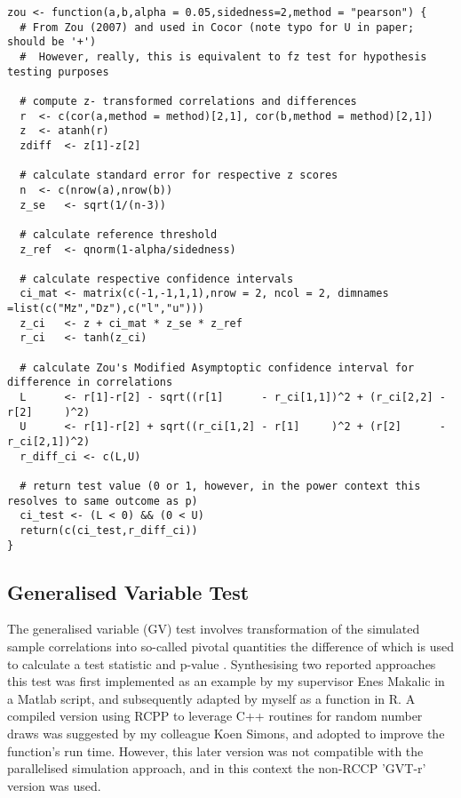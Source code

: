 \begin{lstlisting}[caption={Zou's confidence interval}]
zou <- function(a,b,alpha = 0.05,sidedness=2,method = "pearson") {
  # From Zou (2007) and used in Cocor (note typo for U in paper; should be '+')
  #  However, really, this is equivalent to fz test for hypothesis testing purposes
  
  # compute z- transformed correlations and differences
  r  <- c(cor(a,method = method)[2,1], cor(b,method = method)[2,1])
  z  <- atanh(r)
  zdiff  <- z[1]-z[2]
  
  # calculate standard error for respective z scores
  n  <- c(nrow(a),nrow(b))
  z_se   <- sqrt(1/(n-3))

  # calculate reference threshold
  z_ref  <- qnorm(1-alpha/sidedness)
  
  # calculate respective confidence intervals
  ci_mat <- matrix(c(-1,-1,1,1),nrow = 2, ncol = 2, dimnames =list(c("Mz","Dz"),c("l","u")))
  z_ci   <- z + ci_mat * z_se * z_ref
  r_ci   <- tanh(z_ci)
  
  # calculate Zou's Modified Asymptoptic confidence interval for difference in correlations
  L      <- r[1]-r[2] - sqrt((r[1]      - r_ci[1,1])^2 + (r_ci[2,2] - r[2]     )^2)
  U      <- r[1]-r[2] + sqrt((r_ci[1,2] - r[1]     )^2 + (r[2]      - r_ci[2,1])^2)
  r_diff_ci <- c(L,U)
  
  # return test value (0 or 1, however, in the power context this resolves to same outcome as p)
  ci_test <- (L < 0) && (0 < U)
  return(c(ci_test,r_diff_ci))
}
\end{lstlisting}



\subsection{Generalised Variable Test}

The generalised variable (GV) test involves transformation of the simulated sample correlations into so-called pivotal quantities the difference of which is used to calculate a test statistic and p-value \cite{Krishnamoorthy2014}. Synthesising two reported approaches \cite{Krishnamoorthy2007,Kazemi2016} this test was first implemented as an example by my supervisor Enes Makalic in a Matlab script, and subsequently adapted by myself as a function in R.  A compiled version using RCPP to leverage C++ routines for random number draws was suggested by my colleague Koen Simons, and adopted to improve the function's run time. However, this later version was not compatible with the parallelised simulation approach, and in this context the non-RCCP 'GVT-r' version was used.

